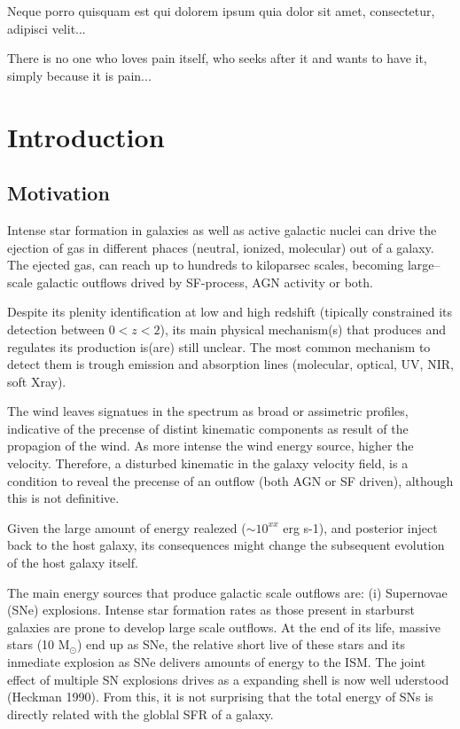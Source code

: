 \begin{savequote}[8cm]
\textlatin{Neque porro quisquam est qui dolorem ipsum quia dolor sit amet, consectetur, adipisci velit...}

There is no one who loves pain itself, who seeks after it and wants to have it, simply because it is pain...
\end{savequote}

\chapter{\label{ch:1-intro}Introduction} 

\minitoc

\section{Motivation}

Intense star formation in galaxies as well as active galactic nuclei can drive the ejection of gas in different phaces (neutral, ionized, molecular) out of a galaxy.
The ejected gas, can reach up to hundreds to kiloparsec scales, becoming large--scale galactic outflows drived by SF-process, AGN activity or both.

Despite its plenity identification at low and high redshift (tipically constrained its detection between $0<z<2$), its main physical mechanism(s) that produces
and regulates its production is(are) still unclear. The most common mechanism to detect them is trough emission and absorption lines (molecular, optical, UV, NIR, soft Xray). 

The wind leaves signatues in the spectrum as broad or assimetric profiles, indicative of the precense of distint kinematic components as result of the propagion of the wind.
As more intense the wind energy source, higher the velocity. Therefore, a disturbed kinematic in the galaxy velocity field, is a condition to reveal the precense of an outflow (both AGN or SF driven), 
although this is not definitive. 
 
Given the large amount of energy  realezed ($\sim 10^{xx}$ erg s-1), and posterior inject back to the host galaxy, its
consequences might change the subsequent evolution of the host galaxy itself. 

The main energy sources that produce galactic scale outflows are: (i) Supernovae (SNe) explosions. Intense star formation rates as those present in starburst galaxies are prone to
develop large scale outflows. At the end of its life, massive stars (10 M$_{\odot}$) end up as SNe, the relative short live of these stars and its inmediate explosion as SNe
delivers amounts of energy to the ISM. The joint effect of multiple SN explosions drives as a expanding shell is now well uderstood (Heckman 1990). From this, it is not surprising that
the total energy of SNs is directly related with the globlal SFR of a galaxy. 


